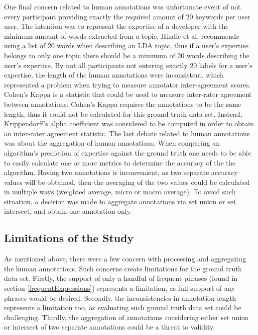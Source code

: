             One final concern related to human annotations was unfortunate event of not every participant providing exactly the required amount of 20 keywords per user user. The intention was to represent the expertise of a developer with the minimum amount of words extracted from a topic. Hindle et al. \cite{hindle2012relating} recommends using a list of 20 words when describing an LDA topic, thus if a user's expertise belongs to only one topic there should be a minimum of 20 words describing the user's expertise. By not all participants not entering exactly 20 labels for a user's expertise, the length of the human annotations were inconsistent, which represented a problem when trying to measure annotator inter-agreement scores. Cohen's Kappa is a statistic that could be used to measure inter-rater agreement between annotations. Cohen's Kappa requires the annotations to be the same length, thus it could not be calculated for this ground truth data set. Instead, Krippendorff's alpha coefficient was considered to be computed in order to obtain an inter-rater agreement statistic. The last debate related to human annotations was about the aggregation of human annotations. When comparing an algorithm's prediction of expertise against the ground truth one needs to be able to easily calculate one or more metrics to determine the accuracy of the the algorithm. Having two annotations is inconvenient, as two separate accuracy values will be obtained, then the averaging of the two values could be calculated in multiple ways (weighted average, micro or macro average). To avoid such situation, a decision was made to aggregate annotations via set union or set intersect, and obtain one annotation only. 
        
        \subsection{Limitations of the Study}
            As mentioned above, there were a few concern with processing and aggregating the human annotations. Such concerns create limitations for the ground truth data set. Firstly, the support of only a handful of frequent phrases (found in section \ref{frequentExpressions}) represents a limitation, as full support of any phrases would be desired. Secondly, the inconsistencies in annotation length represents a limitation too, as evaluating such ground truth data set could be challenging. Thirdly, the aggregation of annotations considering either set union or intersect of two separate annotations could be a threat to validity. 
        
